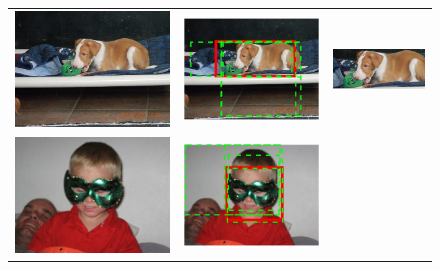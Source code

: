 \setlength{\tabcolsep}{0.5pt}
\begin{figure}[htb]
\begin{center}
\begin{tabular}{ccc}
\includegraphics[width=0.33\linewidth,height=0.3\linewidth]{figs/re-classification/ILSVRC2012_val_00000115} &
\includegraphics[width=0.33\linewidth,height=0.3\linewidth]{figs/re-classification/boundingbox/ILSVRC2012_val_00000115} &
\includegraphics[width=0.33\linewidth,height=0.3\linewidth]{figs/re-classification/crop_image/ILSVRC2012_val_00000115} \\
\includegraphics[width=0.33\linewidth,height=0.3\linewidth]{figs/re-classification/ILSVRC2012_val_00000608} &
\includegraphics[width=0.33\linewidth,height=0.3\linewidth]{figs/re-classification/boundingbox/ILSVRC2012_val_00000608} &

\end{tabular}
\end{center}
\end{figure}
